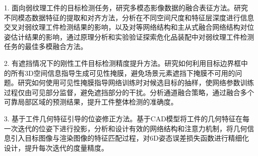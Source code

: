 \documentclass[12pt]{article}
\begin{document}
1. 面向弱纹理工件的目标检测任务，研究多模态影像数据的融合表征方法。研究不同模态数据特征的提取和对齐方法，分析在不同空间尺度和特征层深度进行信息交叉对弱纹理工件检测结果的影响，以及对等网络结构和主从式融合网络结构对位姿估计结果的影响，通过原理分析和实验验证探索危化品装配中对弱纹理工件检测任务的最佳多模融合方法。



2. 有遮挡情况下的刚性工件目标检测精度提升方法。研究如何利用目标边界框中的所有3D空间信息指导生成可见性掩膜，避免场景元素遮挡下掩膜不可用的问题。研究如何使用可见性掩膜指导网络训练时对候选目标的抽样，使网络参数训练过程仅由可见部分监督，避免遮挡部分的干扰。分析通道融合策略，通过融合多个可靠局部区域的预测结果，提升工件整体检测的准确度。




3. 基于工件几何特征引导的位姿修正方法。基于CAD模型将工件的几何特征在每一次迭代的位姿下进行投影，分析和设计有效的网络结构和注意力机制，将几何信息引入目标图像与渲染图像的特征匹配过程，对6D姿态误差损失函数进行精细化设计，提升每次迭代的度量精度。
\end{document}
